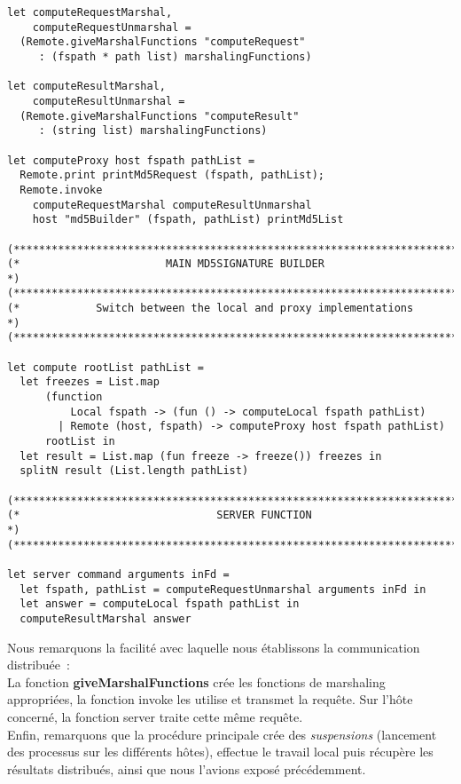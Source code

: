 \documentclass[11pt]{report}
\newcommand{\data}[1]{\emph{#1}}
\newcommand{\func}[1]{\textbf{#1}}
\begin{document}
{\begin{verbatim}
let computeRequestMarshal,
    computeRequestUnmarshal =
  (Remote.giveMarshalFunctions "computeRequest"
     : (fspath * path list) marshalingFunctions)

let computeResultMarshal,
    computeResultUnmarshal =
  (Remote.giveMarshalFunctions "computeResult"
     : (string list) marshalingFunctions)

let computeProxy host fspath pathList =
  Remote.print printMd5Request (fspath, pathList);
  Remote.invoke
    computeRequestMarshal computeResultUnmarshal
    host "md5Builder" (fspath, pathList) printMd5List

(***************************************************************************)
(*                       MAIN MD5SIGNATURE BUILDER                         *)
(***************************************************************************)
(*            Switch between the local and proxy implementations           *)
(***************************************************************************)

let compute rootList pathList =
  let freezes = List.map
      (function
          Local fspath -> (fun () -> computeLocal fspath pathList)
        | Remote (host, fspath) -> computeProxy host fspath pathList)
      rootList in
  let result = List.map (fun freeze -> freeze()) freezes in
  splitN result (List.length pathList)

(***************************************************************************)
(*                               SERVER FUNCTION                           *)
(***************************************************************************)

let server command arguments inFd =
  let fspath, pathList = computeRequestUnmarshal arguments inFd in
  let answer = computeLocal fspath pathList in
  computeResultMarshal answer
\end{verbatim} 
Nous remarquons la facilit\'e avec laquelle nous \'etablissons la
communication distribu\'ee~:\\
La fonction \func{giveMarshalFunctions} cr\'ee les fonctions de marshaling 
appropri\'ees, la fonction invoke les utilise et transmet la requ\^ete.
Sur l'h\^ote concern\'e, la fonction server traite cette m\^eme requ\^ete.\\
Enfin, remarquons que la proc\'edure principale cr\'ee des \data{suspensions}
(lancement des processus sur les diff\'erents h\^otes), effectue le travail
local puis r\'ecup\`ere les r\'esultats distribu\'es, ainsi que nous l'avions
expos\'e pr\'ec\'edemment.
}
\end{document}
